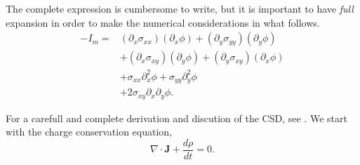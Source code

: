 \documentclass{article}
\newcommand{\Jd}{\mathbf{J}}
\begin{document}
The complete expression is cumbersome to write, but it is important to
have \emph{full} expansion in order to make the numerical considerations
in what follows.
\begin{equation}
  \begin{split}
  -I_m= & (\partial_x \sigma_{xx}) (\partial_x \phi) +
  (\partial_y \sigma_{yy}) (\partial_y \phi)\\
& +(\partial_x \sigma_{xy}) (\partial_y \phi) +(\partial_y \sigma_{xy}) (\partial_x \phi)\\
& + \sigma_{xx} \partial_x^2 \phi + \sigma_{yy} \partial_y^2 \phi\\
& + 2\sigma_{xy} \partial_x\partial_y \phi. 
\end{split}
 \end{equation}
  




For a carefull and complete derivation and discution of the CSD, 
see \cite{Bedard11}. We start with the charge conservation equation,
\begin{equation}
\nabla \cdot \Jd + \frac{d \rho}{d t} =0.
\end{equation}




\end{document}
